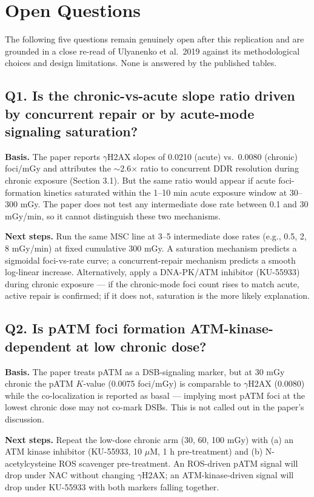 \section{Open Questions}

The following five questions remain genuinely open after this replication and are
grounded in a close re-read of Ulyanenko et al.\ 2019 against its methodological
choices and design limitations. None is answered by the published tables.

\subsection*{Q1. Is the chronic-vs-acute slope ratio driven by concurrent repair or by acute-mode signaling saturation?}
\textbf{Basis.} The paper reports $\gamma$H2AX slopes of 0.0210 (acute) vs.\ 0.0080
(chronic) foci/mGy and attributes the $\sim$2.6$\times$ ratio to concurrent DDR
resolution during chronic exposure (Section 3.1). But the same ratio would appear if
acute foci-formation kinetics saturated within the 1--10 min acute exposure window at
30--300 mGy. The paper does not test any intermediate dose rate between 0.1 and
30 mGy/min, so it cannot distinguish these two mechanisms.

\textbf{Next steps.} Run the same MSC line at 3--5 intermediate dose rates
(e.g., 0.5, 2, 8 mGy/min) at fixed cumulative 300 mGy. A saturation mechanism predicts a
sigmoidal foci-vs-rate curve; a concurrent-repair mechanism predicts a smooth
log-linear increase. Alternatively, apply a DNA-PK/ATM inhibitor (KU-55933) during
chronic exposure --- if the chronic-mode foci count rises to match acute, active repair
is confirmed; if it does not, saturation is the more likely explanation.

\subsection*{Q2. Is pATM foci formation ATM-kinase-dependent at low chronic dose?}
\textbf{Basis.} The paper treats pATM as a DSB-signaling marker, but at 30 mGy chronic
the pATM $K$-value (0.0075 foci/mGy) is comparable to $\gamma$H2AX (0.0080) while the
co-localization is reported as basal --- implying most pATM foci at the lowest chronic
dose may not co-mark DSBs. This is not called out in the paper's discussion.

\textbf{Next steps.} Repeat the low-dose chronic arm (30, 60, 100 mGy) with (a) an ATM
kinase inhibitor (KU-55933, 10 $\mu$M, 1 h pre-treatment) and (b) N-acetylcysteine ROS
scavenger pre-treatment. An ROS-driven pATM signal will drop under NAC without changing
$\gamma$H2AX; an ATM-kinase-driven signal will drop under KU-55933 with both markers
falling together.

